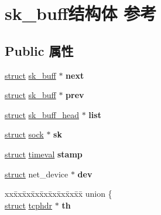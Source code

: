 \hypertarget{structsk__buff}{}\section{sk\+\_\+buff结构体 参考}
\label{structsk__buff}
\subsection*{Public 属性}
\begin{DoxyCompactItemize}
\item 
\mbox{\label{structsk__buff_a40ea1fc7b0227a1fb9045ccdd24c613e}} 
\hyperlink{interfacestruct}{struct} \hyperlink{structsk__buff}{sk\+\_\+buff} $\ast$ {\bfseries next}
\item 
\mbox{\label{structsk__buff_a1282b8796809e69438dc508c1826919d}} 
\hyperlink{interfacestruct}{struct} \hyperlink{structsk__buff}{sk\+\_\+buff} $\ast$ {\bfseries prev}
\item 
\mbox{\label{structsk__buff_a8576c47f0063e61bab10207f991aa8f4}} 
\hyperlink{interfacestruct}{struct} \hyperlink{structsk__buff__head}{sk\+\_\+buff\+\_\+head} $\ast$ {\bfseries list}
\item 
\mbox{\label{structsk__buff_a9f81b93584ec22325588e522e5261838}} 
\hyperlink{interfacestruct}{struct} \hyperlink{structsock}{sock} $\ast$ {\bfseries sk}
\item 
\mbox{\label{structsk__buff_aa77d7591bd29d269afa436ad1705e3b2}} 
\hyperlink{interfacestruct}{struct} \hyperlink{structtimeval}{timeval} {\bfseries stamp}
\item 
\mbox{\label{structsk__buff_a9089adc22046f2297cd7db1854ec573f}} 
\hyperlink{interfacestruct}{struct} net\+\_\+device $\ast$ {\bfseries dev}
\item 
\mbox{\label{structsk__buff_a168e4723094558bcef6bd3c58e3bbe8d}} 
\begin{tabbing}
xx\=xx\=xx\=xx\=xx\=xx\=xx\=xx\=xx\=\kill
union \{\\
\>\hyperlink{interfacestruct}{struct} \hyperlink{structtcphdr}{tcphdr} $\ast$ {\bfseries th}\\

\end{tabbing}
\end{DoxyCompactItemize}

